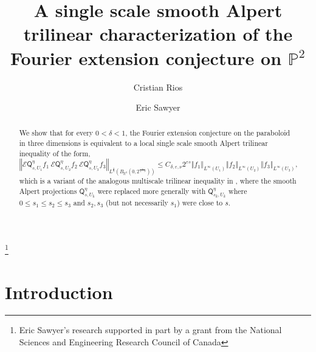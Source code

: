 \documentclass{amsart}%
\theoremstyle{plain}
\numberwithin{equation}{section}
\begin{document}
\title[Trilinear Fourier characterization]{A single scale smooth Alpert trilinear characterization of the Fourier
extension conjecture on $\mathbb{P}^{2}$}
\author{Cristian Rios}
\address{University of Calgary\\
Calgary, Alberta, Canada}
\author{Eric Sawyer}
\address{McMaster University\\
Hamilton, Ontario, Canada}
\thanks{Eric Sawyer's research supported in part by a grant from the National Sciences
and Engineering Research Council of Canada}
\maketitle

\begin{abstract}
We show that for every $0<\delta<1$, the Fourier extension conjecture on the
paraboloid in three dimensions is equivalent to a local single scale smooth
Alpert trilinear inequality of the form,%
\[
\left\Vert \mathcal{E}\mathsf{Q}_{s,U_{1}}^{\eta}f_{1}\ \mathcal{E}%
\mathsf{Q}_{s,U_{2}}^{\eta}f_{2}\ \mathcal{E}\mathsf{Q}_{s,U_{3}}^{\eta}%
f_{3}\right\Vert _{L^{\frac{q}{3}}\left(  B_{\mathbb{R}^{3}}\left(
0,2^{\frac{s}{1-\delta}}\right)  \right)  }\leq C_{\delta,\varepsilon,\nu
}2^{\varepsilon s}\left\Vert f_{1}\right\Vert _{L^{\infty}\left(
U_{1}\right)  }\left\Vert f_{2}\right\Vert _{L^{\infty}\left(  U_{2}\right)
}\left\Vert f_{3}\right\Vert _{L^{\infty}\left(  U_{3}\right)  },
\]
which is a variant of the analogous multiscale trilinear inequality in
\cite{RiSa}, where the smooth Alpert projections $\mathsf{Q}_{s,U_{k}}^{\eta}$
were replaced more generally with $\mathsf{Q}_{s_{k},U_{k}}^{\eta}$ where
$0\leq s_{1}\leq s_{2}\leq s_{3}$ and $s_{2},s_{3}$ (but not necessarily
$s_{1}$) were close to $s$.

\end{abstract}
\tableofcontents


\section{Introduction}
\end{document}
